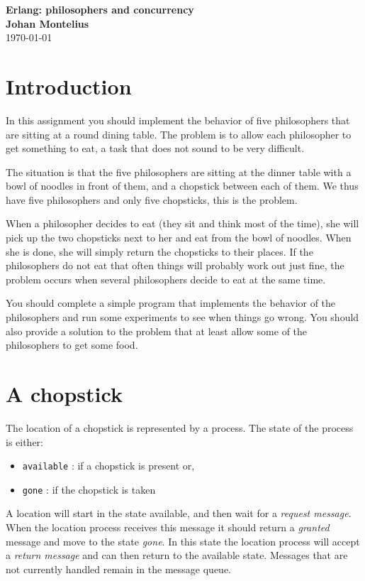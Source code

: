 \documentclass[a4paper,11pt]{article}
\newcommand{\nnsection}[1]{
\section*{#1}
\addcontentsline{toc}{section}{#1}
}
\begin{document}
\begin{center}
\vspace{20pt}
\textbf{\large Erlang: philosophers and concurrency}\\
\vspace{10pt}
\textbf{Johan Montelius}\\
\vspace{10pt}
\today{}
\end{center}

\nnsection{Introduction}

In this assignment you should implement the behavior of five
philosophers that are sitting at a round dining table. The problem is to
allow each philosopher to get something to eat, a task that does not
sound to be very difficult. 

The situation is that the five philosophers are sitting at the dinner
table with a bowl of noodles in front of them, and a chopstick
between each of them. We thus have five philosophers and only five
chopsticks, this is the problem.

When a philosopher decides to eat (they sit and think most of the
time), she will pick up the two chopsticks next to her and eat from
the bowl of noodles. When she is done, she will simply return the
chopsticks to their places. If the philosophers do not eat that often
things will probably work out just fine, the problem occurs when
several philosophers decide to eat at the same time.

You should complete a simple program that implements the behavior
of the philosophers and run some experiments to see when things go
wrong. You should also provide a solution to the problem that at least
allow some of the philosophers to get some food.  

\section{A chopstick}

The location of a chopstick is represented by a process. The state of
the process is either:

\begin{itemize}
\item {\tt available} : if a chopstick is present or,
\item {\tt gone} : if the chopstick is taken
\end{itemize}

A location will start in the state available, and then wait for a {\em
  request message}. When the location process receives this message it
should return a {\em granted} message and move to the state {\em
  gone}. In this state the location process will accept a {\em return
  message} and can then return to the available state. Messages that
are not currently handled remain in the message queue.
\end{document}
